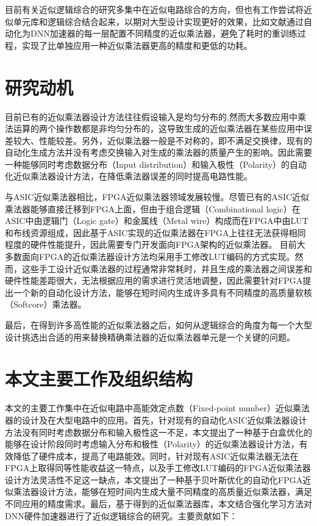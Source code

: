 

目前有关近似逻辑综合的研究多集中在近似电路综合的方向\cite{AC:ALS:ALSRAC}，但也有工作尝试将近似单元库和逻辑综合结合起来，以期对大型设计实现更好的效果，比如文献\cite{Accelerator:ALWANN}通过自动化为DNN加速器的每一层配置不同精度的近似乘法器，避免了耗时的重训练过程，实现了比单独应用一种近似乘法器更高的精度和更低的功耗。



\section{研究动机}


目前已有的近似乘法器设计方法往往假设输入是均匀分布的,然而大多数应用中乘法运算的两个操作数都是非均匀分布的，这导致生成的近似乘法器在某些应用中误差较大、性能较差。另外，近似乘法器一般是不对称的，即不满足交换律，现有的自动化生成方法并没有考虑交换输入对生成的乘法器的质量产生的影响。因此需要一种能够同时考虑数据分布（Input distribution）和输入极性（Polarity）的自动化近似乘法器设计方法，在降低乘法器误差的同时提高电路性能。

与ASIC近似乘法器相比，FPGA近似乘法器领域发展较慢。尽管已有的ASIC近似乘法器能够直接迁移到FPGA上面，但由于组合逻辑（Combinational logic）在ASIC中由逻辑门（Logic gate）和金属线（Metal wire）构成而在FPGA中由LUT和布线资源组成，因此基于ASIC实现的近似乘法器在FPGA上往往无法获得相同程度的硬件性能提升，因此需要专门开发面向FPGA架构的近似乘法器。
目前大多数面向FPGA的近似乘法器设计方法均采用手工修改LUT编码的方式实现。然而，这些手工设计近似乘法器的过程通常非常耗时，并且生成的乘法器之间误差和硬件性能差距很大，无法根据应用的需求进行灵活地调整，因此需要针对FPGA提出一个新的自动化设计方法，能够在短时间内生成许多具有不同精度的高质量软核（Softcore）乘法器。

最后，在得到许多高性能的近似乘法器之后，如何从逻辑综合的角度为每一个大型设计挑选出合适的用来替换精确乘法器的近似乘法器单元是一个关键的问题。


\section{本文主要工作及组织结构}

本文的主要工作集中在近似电路中高能效定点数（Fixed-point number）近似乘法器的设计及在大型电路中的应用。首先，针对现有的自动化ASIC近似乘法器设计方法没有同时考虑数据分布和输入极性这一不足，本文提出了一种基于白盒优化的能够在设计阶段同时考虑输入分布和极性（Polarity）的近似乘法器设计方法，有效降低了硬件成本，提高了电路能效。同时，针对现有ASIC近似乘法器无法在FPGA上取得同等性能收益这一特点，以及手工修改LUT编码的FPGA近似乘法器设计方法灵活性不足这一缺点，本文提出了一种基于贝叶斯优化的自动化FPGA近似乘法器设计方法，能够在短时间内生成大量不同精度的高质量近似乘法器，满足不同应用的精度需求。最后，基于得到的近似乘法器库，本文结合强化学习方法对DNN硬件加速器进行了近似逻辑综合的研究。主要贡献如下：

